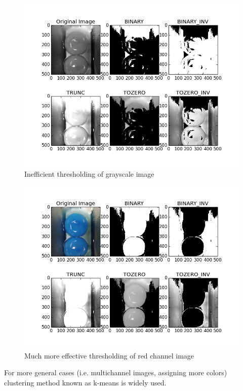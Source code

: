 \documentclass[12pt,twoside,a4paper]{article}
\begin{document}
\begin{figure}[H]
\centering
\includegraphics[width=0.4\paperwidth]{gray}
\caption{Inefficient thresholding of grayscale image}\label{fig:gray}
\end{figure}

\begin{figure}[H]
\centering
\includegraphics[width=0.4\paperwidth]{red}
\caption{Much more effective thresholding of red channel image}\label{fig:red}
\end{figure}

For more general cases (i.e. multichannel images, assigning more colors) clustering method known as k-means is widely used.\cite{lesscv}
 
\end{document}
